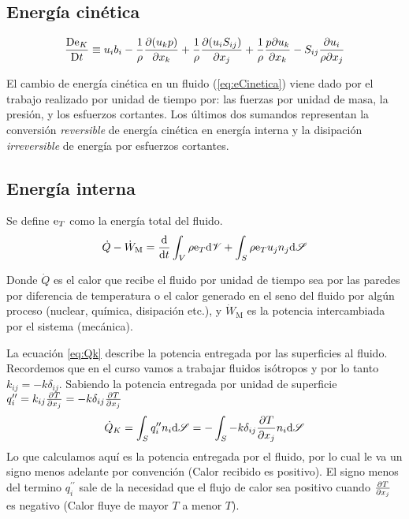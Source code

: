 \subsection{Energía cinética}

\begin{equation}\label{eq:eCinetica}
\frac{\textrm{D} \textrm{e}_K}{\textrm{D} t}\equiv u_i b_i-\frac{1}{\rho}\frac{\partial (u_k p)}{\partial x_k} +\frac{1}{\rho} \frac{\partial (u_i S_{ij})}{\partial x_j}+\frac{1}{\rho} \frac{p\partial u_k}{\partial x_k}-S_{ij} \frac{\partial u_i}{\rho \partial x_j}
\end{equation}

El cambio de energía cinética en un fluido (\ref{eq:eCinetica}) viene dado por el trabajo realizado por unidad de tiempo por: las fuerzas por unidad de masa, la presión, y los esfuerzos cortantes. Los últimos dos sumandos representan la conversión \emph{reversible} de energía cinética en energía interna y la disipación \emph{irreversible} de energía por esfuerzos cortantes.
\subsection{Energía interna}
Se define $\textrm{e}_T$ como la energía total del fluido.
\begin{equation}\label{eq:etotal}
    \dot{Q}-\dot{W}_\textrm{M}=\frac{\textrm{d} }{\textrm{d} t}\int_V \rho \textrm{e}_T \textrm{d} \mathscr{V} +\int_S \rho \textrm{e}_T u_j n_j \textrm{d} \mathscr{S}
\end{equation}

Donde $\dot{Q}$ es el calor que recibe el fluido por unidad de tiempo sea por las paredes por diferencia de temperatura o el calor generado en el seno del fluido por algún proceso (nuclear, química, disipación etc.), y $\dot{W}_\textrm{M}$ es la potencia intercambiada por el sistema (mecánica).


 La ecuación \ref{eq:Qk} describe la potencia entregada por las superficies al fluido. Recordemos que en el curso vamos a trabajar fluidos isótropos y por lo tanto $k_{ij}=-k \delta_{ij}$. Sabiendo la potencia entregada por unidad de superficie $q_i^{\prime \prime}=k_{ij}\frac{\partial T}{\partial x_j}=-k\delta_{ij}\frac{\partial T}{\partial x_j}$ 
\begin{equation}\label{eq:Qk}
    \dot{Q}_K=\int_S q_i^{\prime \prime} n_i \textrm{d} \mathscr{S} = -\int_S - k\delta_{ij}\frac{\partial T}{\partial x_j}n_i \textrm{d} \mathscr{S}
\end{equation}
Lo que calculamos aquí es la potencia entregada por el fluido, por lo cual le va un signo menos adelante por convención (Calor recibido es positivo). El signo menos del termino $q_i^{\prime \prime} $ sale de la necesidad que el flujo de calor sea positivo cuando $\frac{\partial T}{\partial x_j}$ es negativo (Calor fluye de mayor $T$ a menor $T$).


